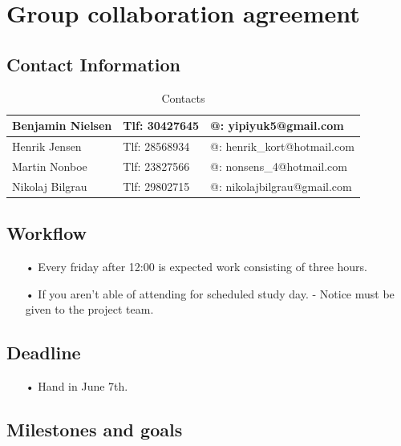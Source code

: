 \section{Group collaboration agreement}
\subsection{Contact Information}
\begin{table}[h!]
\centering
\caption{Contacts}
\label{Contact info}
\begin{tabular}{|l|l|l|}
\hline
Benjamin Nielsen & Tlf: 30427645 & @: yipiyuk5@gmail.com       \\ \hline
Henrik Jensen    & Tlf: 28568934 & @: henrik\_kort@hotmail.com \\ \hline
Martin Nonboe    & Tlf: 23827566 & @: nonsens\_4@hotmail.com   \\ \hline
Nikolaj Bilgrau  & Tlf: 29802715 & @: nikolajbilgrau@gmail.com \\ \hline
\end{tabular}
\end{table}

\subsection{Workflow}
\begin{enumerate}
	\item[•]Every friday after 12:00 is expected work consisting of three hours.   
	\item[•]If you aren’t able of attending for scheduled study day. - Notice must be given to the project team. 
\end{enumerate}

\subsection{Deadline}
\begin{enumerate}
	\item[•]Hand in June 7th.
\end{enumerate}

\subsection{Milestones and goals}

